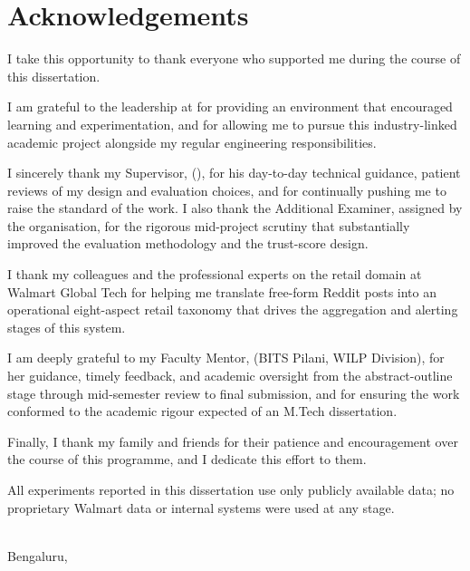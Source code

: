 \chapter*{Acknowledgements}

I take this opportunity to thank everyone who supported me during the course of
this dissertation.

I am grateful to the leadership at \textbf{\org} for providing an environment
that encouraged learning and experimentation, and for allowing me to pursue
this industry-linked academic project alongside my regular engineering
responsibilities.

I sincerely thank my Supervisor, \textbf{\supervisor}
(\supervisordesig), for his day-to-day technical guidance, patient reviews of
my design and evaluation choices, and for continually pushing me to raise the
standard of the work.  I also thank the Additional Examiner, assigned by the
organisation, for the rigorous mid-project scrutiny that substantially improved
the evaluation methodology and the trust-score design.

I thank my colleagues and the professional experts on the retail domain at
Walmart Global Tech for helping me translate free-form Reddit posts into an
operational eight-aspect retail taxonomy that drives the aggregation and
alerting stages of this system.

I am deeply grateful to my Faculty Mentor, \textbf{\faculty} (BITS Pilani,
WILP Division), for her guidance, timely feedback, and academic oversight from
the abstract-outline stage through mid-semester review to final submission,
and for ensuring the work conformed to the academic rigour expected of an
M.Tech dissertation.

Finally, I thank my family and friends for their patience and encouragement
over the course of this programme, and I dedicate this effort to them.

All experiments reported in this dissertation use only publicly available
data; no proprietary Walmart data or internal systems were used at any stage.

\vspace{28pt}
\noindent\textbf{\student}\\
Bengaluru, \submdate
\cleardoublepage
